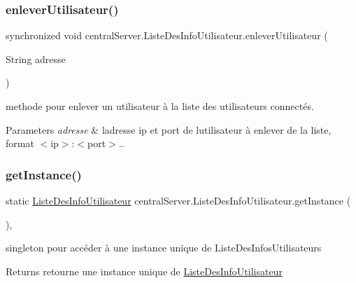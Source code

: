 \subsubsection{\texorpdfstring{enlever\+Utilisateur()}{enleverUtilisateur()}}
{\footnotesize\ttfamily synchronized void central\+Server.\+Liste\+Des\+Info\+Utilisateur.\+enlever\+Utilisateur (\begin{DoxyParamCaption}\item[{String}]{adresse }\end{DoxyParamCaption})\hspace{0.3cm}{\ttfamily [inline]}}



methode pour enlever un utilisateur à la liste des utilisateurs connectés. 


\begin{DoxyParams}{Parameters}
{\em adresse} & l\textquotesingle{}adresse ip et port de l\textquotesingle{}utilisateur à enlever de la liste, format $<$ip$>$\+:$<$port$>$.. \\
\hline
\end{DoxyParams}
\mbox{\label{classcentralServer_1_1ListeDesInfoUtilisateur_acf5b606e4e19bca4a22ca77a314e5bac}} 
\subsubsection{\texorpdfstring{get\+Instance()}{getInstance()}}
{\footnotesize\ttfamily static \hyperlink{classcentralServer_1_1ListeDesInfoUtilisateur}{Liste\+Des\+Info\+Utilisateur} central\+Server.\+Liste\+Des\+Info\+Utilisateur.\+get\+Instance (\begin{DoxyParamCaption}{ }\end{DoxyParamCaption})\hspace{0.3cm}{\ttfamily [inline]}, {\ttfamily [static]}}



singleton pour accéder à une instance unique de Liste\+Des\+Infos\+Utilisateurs 

\begin{DoxyReturn}{Returns}
retourne une instance unique de \hyperlink{classcentralServer_1_1ListeDesInfoUtilisateur}{Liste\+Des\+Info\+Utilisateur} 
\end{DoxyReturn}
\mbox{\label{classcentralServer_1_1ListeDesInfoUtilisateur_a5949b79438d8cacb07e79dd9bc40876b}} 
